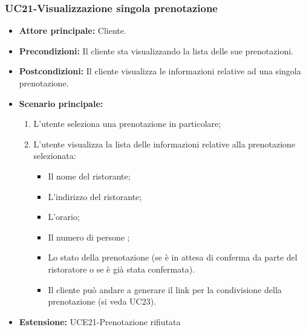 \subsubsection{UC21-Visualizzazione singola prenotazione}
\begin{itemize}
    \item \textbf{Attore principale: } Cliente.
    \item \textbf{Precondizioni: }Il cliente sta visualizzando la lista delle sue prenotazioni.
    \item \textbf{Postcondizioni: }Il cliente visualizza le informazioni relative ad una singola prenotazione.
    \item \textbf{Scenario principale:}
        \begin{enumerate}
            \item L'utente seleziona una prenotazione in particolare;
            \item L'utente visualizza la lista delle informazioni relative alla prenotazione selezionata:
            \begin{itemize}
                \item Il nome del ristorante;
                \item L'indirizzo del ristorante;
                \item L'orario;
                \item Il numero di persone ;
                \item Lo stato della prenotazione (se è in attesa di conferma da parte del ristoratore
                o se è già stata confermata).
            \item Il cliente può andare a generare il link per la condivisione della prenotazione (si veda UC23).
            \end{itemize}
        \end{enumerate}
    \item \textbf{Estensione: }UCE21-Prenotazione rifiutata
\end{itemize}

